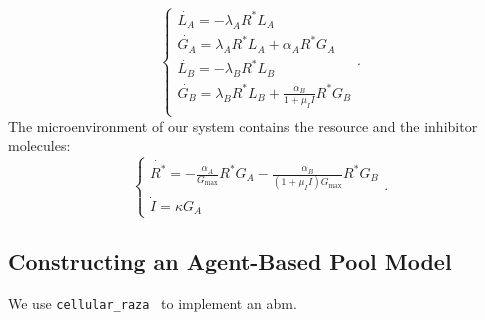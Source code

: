 \documentclass[10pt,A4paper]{article}
\numberwithin{equation}{section}
\begin{document}
\begin{equation}
    \begin{cases}
        \dot{L_A} = -\lambda_A R^* L_A\\
        \dot{G_A} = \lambda_A R^* L_A + \alpha_A R^* G_A\\
        \dot{L_B} = -\lambda_B R^* L_B\\
        \dot{G_B} = \lambda_B R^* L_B + \frac{\alpha_B}{1 + \mu_I I} R^* G_B\\
    \end{cases}.
    \label{eq:spatial_limit_F}
\end{equation}
%
The microenvironment of our system contains the resource and the inhibitor molecules:
\begin{equation}
    \begin{cases}
        \dot{R^*} = -\frac{\alpha_A}{G_\text{max}} R^* G_A-\frac{\alpha_B}{(1 + \mu_I I) G_\text{max}} R^* G_B \\
        \dot{I} = \kappa G_A
    \end{cases}.
    \label{eq:spatial_limit_H}
\end{equation}

\subsection{Constructing an Agent-Based Pool Model}
We use \texttt{cellular\_raza}~\cite{Pleyer2025} to implement an \ac{abm}.
\end{document}
